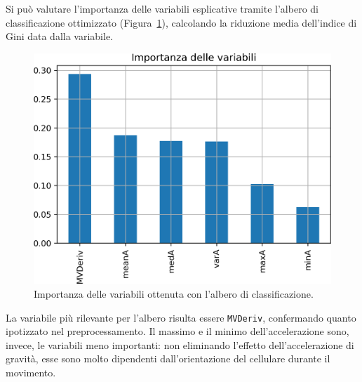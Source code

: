 \documentclass[main.tex]{subfiles}
\begin{document}
Si può valutare l'importanza delle variabili esplicative tramite l'albero di classificazione ottimizzato (Figura~\ref{fig:importance-Tree}), calcolando la riduzione media dell'indice di Gini data dalla variabile.
\begin{figure}[H]
	\centering
	\includegraphics[width=\confusion]{../../figure/importance-Tree.png}
	\caption{Importanza delle variabili ottenuta con l'albero di classificazione.}
	\label{fig:importance-Tree}
\end{figure}
La variabile più rilevante per l'albero risulta essere \texttt{MVDeriv}, confermando quanto ipotizzato nel preprocessamento. Il massimo e il minimo dell'accelerazione sono, invece, le variabili meno importanti: non eliminando l'effetto dell'accelerazione di gravità, esse sono molto dipendenti dall'orientazione del cellulare durante il movimento.
\end{document}
